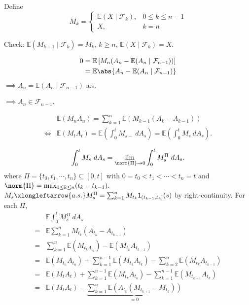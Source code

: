 {    Define 
    $$ M_k = \begin{cases}
       \mathbb{E}(X \mid \mathcal{F}_{k}),& 0 \leq k \leq n-1\\
       X, &k=n
    \end{cases}$$

    Check: $\mathbb{E}(M_{k+1} \mid \mathcal{F}_{k}) = M_k$, $k \geq n$, $\mathbb{E}(X \mid \mathcal{F}_{k}) = X$.

    $$
    \begin{aligned}
        0 &= \mathbb{E}\left[ M_n (A_n - \mathbb{E}(A_n \mid \mathcal{F}_{n-1})) \right]\\
        &= \mathbb{E} \abs{A_n - \mathbb{E}(A_n \mid \mathcal{F}_{n-1})}
    \end{aligned}
    $$
    $\implies A_n = \mathbb{E}(A_n \mid \mathcal{F}_{n-1})$ a.s.
    
    $\implies A_n \in \mathcal{F}_{n-1}.$
}

$$
    \begin{aligned}
        &\mathbb{E}(M_n A_n) = \sum_{k=1}^n \mathbb{E}\left( M_{k-1} (A_k - A_{k-1}) \right) \\
        \Longleftrightarrow &
        \mathbb{E}(M_tA_t) = \mathbb{E}\left( \int_{0}^{t}M_{s-}~dA_s \right) = \mathbb{E}\left( \int_{0}^{t} M_s ~dA_s \right).
    \end{aligned}
$$

$$
    \int_{0}^{t} M_s ~d A_s = \lim_{\norm{\Pi}\to 0} \int_{0}^{t} M_s^\Pi ~d A_s.
$$
where $\Pi = \{t_0, t_1,\cdots,t_n\}\subseteq[0,t]$ with $0 = t_0 < t_1 < \cdots < t_n = t$ and $\norm{\Pi} = \max_{1 \leq k \leq n}(t_k - t_{k-1}).$ $M_s \xlongleftarrow{a.s.} M_s^\Pi = \sum_{k=1}^{n} M_{t_k}\mathsf{1}_{(t_{k-1},t_k]}(s)$ by right-continuity. For each $\Pi$, 
$$
\begin{aligned}
&\mathbb{E}\int_{0}^{t}M_s ^\Pi ~d A_s \\
=& \mathbb{E} \sum_{k=1}^n M_{t_k}(A_{t_k} - A_{t_{k-1}}) \\
=& \sum_{k=1}^n \mathbb{E}(M_{t_k A_{t_k}}) - \mathbb{E}(M_{t_k}A_{t_{k-1}})\\
=&\mathbb{E}(M_{t_n}A_{t_n}) + \sum_{k=1}^{n-1}\mathbb{E}(M_{t_{k}} A_{t_{k}}) - \sum_{k=2}^{n}\mathbb{E}(M_{t_k} A_{t_{k-1}})\\
=& \mathbb{E}(M_t A_t) + \sum_{k=1}^{n-1}\mathbb{E}(M_{t_k} A_{t_k}) - \sum_{k=1}^{n-1}\mathbb{E}(M_{t_{k+1}}A_{t_k}) \\
=& \mathbb{E}(M_t A_t) - \underbrace{\sum_{k=1}^{n}\mathbb{E}\left( A_{t_k} (M_{t_{k+1}} - M_{t_k}) \right)}_{=0}
\end{aligned}
$$

